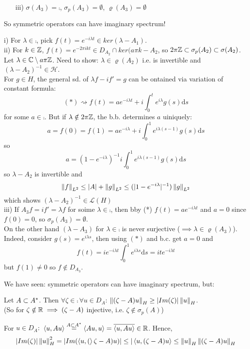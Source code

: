 \begin{example}
\begin{itemize}
		\item [iii)] $\sigma(A_3)=\comp$, $\sigma_p(A_3)=\emptyset$, $\varrho(A_3)=\emptyset$
	\end{itemize}
	So symmetric operators can have imaginary spectrum!
	\begin{pf}{}{}
		i) For $\lambda\in\comp$, pick $f(t)=e^{-i\lambda t}\in ker(\lambda-A_1)$.\\
		ii) For $k\in\mathbb{Z}$, $f(t)=e^{-2\pi ikt}\in D_{A_2}\cap ker(a\pi k-A_2$,
		so $2\pi \mathbb{Z}\subset \sigma_p(A_2)\subset\sigma(A_2)$.
		Let $\lambda\in\mathbb{C}\setminus a\pi\mathbb{Z}$.
		Need to show: $\lambda\in\varrho(A_2)$ i.e.  is invertible and $(\lambda-A_2)^{-1}\in\mathcal{H}$.\\
		For $g\in H$, the general sd. of $\lambda f-if'=g$ can be ontained via variation of constant formula:
		$$
			(*)\rightsquigarrow f(t)=ae^{-i\lambda t}+i \int_0^t e^{i\lambda}g(s)\mathrm{d}s
		$$
		for some $a\in\comp$. But if $\lambda\notin2\pi\mathbb{Z}$, the b.b. determines $a$ uiniquely:
		$$
			a=f(0)=f(1)=ae^{-i\lambda}+i\int_0^1e^{i\lambda(s-1)}g(s)\mathrm{d}s$$
		so
		$$
			a=(1-e^{-i\lambda})^{-1}i\int_0^1e^{i\lambda(s-1)}g(s)\mathrm{d}s
		$$
		so $\lambda-A_2$ is invertible and
		$$
        \left\|{f}\right\|_{L^2}\leq |A|+\left\|{g}\right\|_{L^2}\leq(|1-e^{-i\lambda}|^{-1})\left\|{g}\right\|_{L^2}
        $$
		which shows $(\lambda-A_2)^{-1}\in\mathcal{L}(H)$\\
		iii) If $A_3f=if'=\lambda f$ for soime $\lambda\in\comp$, then bby (*) $f(t)=ae^{-i\lambda t}$ and $a=0$ since $f(0)=0$, so $\sigma_p(A_3)=\emptyset$.\\
		On the other hand $(\lambda-A_3)$ for $\lambda\in\comp$ is never surjective ($\implies \lambda\in\varrho(A_3)$). Indeed, consider $g(s)=e^{i\lambda s}$, then using $(*)$ and b.c. get $a=0$ and
		$$
        f(t)=ie^{-i\lambda t}\int_0^1e^{i\lambda s} \mathrm{d}s=ite^{-i\lambda t}
        $$
		but $f(1)\neq0$ so $f\notin D_{A_3}$.
	\end{pf}
\end{example}
We have seen: symmetric operators can have imaginary spectrum, but:
\begin{lemma}
	Let $A\subset {A}^*$. Then $\forall\zeta\in\comp\,\forall u\in D_A$: $\left\|{(\zeta-A)u}\right\|_H\geq |Im(\zeta)|\left\|{u}\right\|_H$.\\
	(So for $\zeta\notin\mathbb{R}\implies(\zeta-A)$ injective, i.e. $\zeta\notin\sigma_p(A)$)
	\begin{pf}{}{}
		For $u\in D_A:$ $\left<{u},{Au}\right>\stackrel{A\subset{A}^*}{=}\left<{Au},{u}\right>=\overline{\left<{u},{Au}\right>}\in\mathbb{R}$. Hence,
		$$
			|Im(\zeta)|\left\|{u}\right\|^2_H=|Im(\left<{u},{(}\right>\zeta-A)u)|\leq|\left<{u},{(\zeta-A)u}\right>\leq\left\|{u}\right\|_H\left\|{(\zeta-A)u}\right\|_H
		$$
	\end{pf}
\end{lemma}
